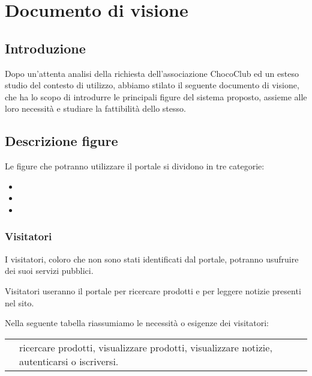 \chapter{Documento di visione} 
\label{cha:documento_di_visione}

\section{Introduzione}
\label{sec:introduzione}
Dopo un'attenta analisi della richiesta dell'associazione ChocoClub ed un esteso studio del contesto di utilizzo, abbiamo stilato il seguente documento di visione, che ha lo scopo di introdurre le principali figure del sistema proposto, assieme alle loro necessità e studiare la fattibilità dello stesso.

\section{Descrizione figure} 
\label{sec:descrizionefigure}
Le figure che potranno utilizzare il portale si dividono in tre categorie:
\begin{itemize}
	\item {}
	\item {}
	\item {}
\end{itemize}

\subsection{Visitatori} %
\label{sub:}
I visitatori, coloro che non sono stati identificati dal portale, potranno usufruire dei suoi servizi pubblici.
\begin{descriptionInd}
    \item[Visitatori] useranno il portale per ricercare prodotti e per leggere notizie presenti nel sito.
\end{descriptionInd}

\noindent
Nella seguente tabella riassumiamo le necessità o esigenze dei visitatori:
\begin{center}
	\begin{tabularx}{0.8\textwidth}{l X}
	\toprule 
		\tabhead{Figura} & \tabhead{Necessità o Esigenze} \\
	\midrule
		\ruolo{Visitatori} & ricercare prodotti, visualizzare prodotti, visualizzare notizie, autenticarsi o iscriversi.  \\
	\bottomrule
	\end{tabularx}
\end{center}

